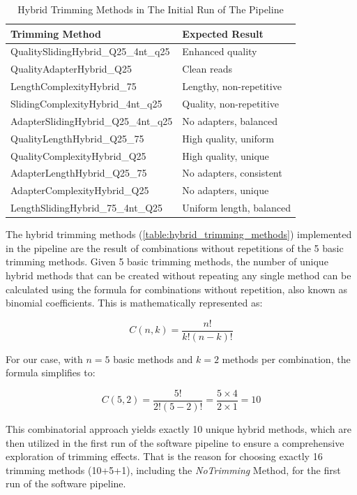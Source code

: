 \begin{table}[ht]
\centering
\begin{tabular}{l l}
\hline
\textbf{Trimming Method} & \textbf{Expected Result} \\ \hline
QualitySlidingHybrid\_Q25\_4nt\_q25 & Enhanced quality \\
QualityAdapterHybrid\_Q25 & Clean reads \\
LengthComplexityHybrid\_75 & Lengthy, non-repetitive \\
SlidingComplexityHybrid\_4nt\_q25 & Quality, non-repetitive \\
AdapterSlidingHybrid\_Q25\_4nt\_q25 & No adapters, balanced \\
QualityLengthHybrid\_Q25\_75 & High quality, uniform \\
QualityComplexityHybrid\_Q25 & High quality, unique \\
AdapterLengthHybrid\_Q25\_75 & No adapters, consistent \\
AdapterComplexityHybrid\_Q25 & No adapters, unique \\
LengthSlidingHybrid\_75\_4nt\_Q25 & Uniform length, balanced \\
\hline
\end{tabular}
\caption{Hybrid Trimming Methods in The Initial Run of The Pipeline}
\label{table:hybrid_trimming_methods}
\end{table}

The hybrid \gls{trimming} methods (\autoref{table:hybrid_trimming_methods}) implemented in the pipeline are the result of combinations without repetitions of the 5 basic \gls{trimming} methods. Given 5 basic \gls{trimming} methods, the number of unique hybrid methods that can be created without repeating any single method can be calculated using the formula for combinations without repetition, also known as binomial coefficients. This is mathematically represented as:

\[
C(n, k) = \frac{n!}{k!(n-k)!}
\]

For our case, with \( n = 5 \) basic methods and \( k = 2 \) methods per combination, the formula simplifies to:

\[
C(5, 2) = \frac{5!}{2!(5-2)!} = \frac{5 \times 4}{2 \times 1} = 10
\]

This combinatorial approach yields exactly 10 unique hybrid methods, which are then utilized in the first run of the software pipeline to ensure a comprehensive exploration of \gls{trimming} effects. That is the reason for choosing exactly 16 \gls{trimming} methods (10+5+1), including the \textit{NoTrimming} Method, for the first run of the software pipeline.

